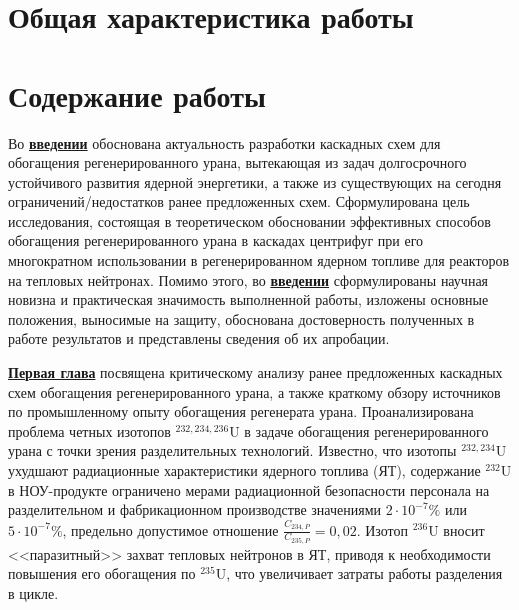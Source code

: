 \section*{Общая характеристика работы}

\newcommand{\actuality}{\underline{\textbf{\actualityTXT}}}
\newcommand{\progress}{\underline{\textbf{\progressTXT}}}
\newcommand{\aim}{\underline{{\textbf\aimTXT}}}
\newcommand{\tasks}{\underline{\textbf{\tasksTXT}}}
\newcommand{\novelty}{\underline{\textbf{\noveltyTXT}}}
\newcommand{\influence}{\underline{\textbf{\influenceTXT}}}
\newcommand{\methods}{\underline{\textbf{\methodsTXT}}}
\newcommand{\defpositions}{\underline{\textbf{\defpositionsTXT}}}
\newcommand{\reliability}{\underline{\textbf{\reliabilityTXT}}}
\newcommand{\probation}{\underline{\textbf{\probationTXT}}}
\newcommand{\contribution}{\underline{\textbf{\contributionTXT}}}
\newcommand{\publications}{\underline{\textbf{\publicationsTXT}}}



\section*{Содержание работы}
Во \underline{\textbf{введении}} обоснована актуальность разработки каскадных схем для обогащения регенерированного урана, вытекающая из задач долгосрочного устойчивого развития ядерной энергетики, а также из существующих на сегодня ограничений/недостатков ранее предложенных схем. Сформулирована цель исследования, состоящая в теоретическом обосновании эффективных способов обогащения регенерированного урана в каскадах центрифуг при его многократном использовании в регенерированном ядерном топливе для реакторов на тепловых нейтронах. Помимо этого, во \underline{\textbf{введении}} сформулированы научная новизна и практическая значимость выполненной работы, изложены основные положения, выносимые на защиту, обоснована достоверность полученных в работе результатов и представлены сведения об их апробации.

\underline{\textbf{Первая глава}} посвящена критическому анализу ранее предложенных каскадных схем обогащения регенерированного урана, а также краткому обзору источников по промышленному опыту обогащения регенерата урана. Проанализирована проблема четных изотопов $^{232,234,236}$U в задаче обогащения регенерированного урана с точки зрения разделительных технологий. Известно, что изотопы $^{232,234}$U ухудшают радиационные характеристики ядерного топлива (ЯТ), содержание $^{232}$U в НОУ-продукте ограничено мерами радиационной безопасности персонала на разделительном и фабрикационном производстве значениями $2\cdot10^{-7} \%$ или $5\cdot10^{-7} \%$, предельно допустимое отношение $\frac{C_{234,{P}}}{C_{235,{P}}} = 0,02$. Изотоп $^{236}$U вносит <<паразитный>> захват тепловых нейтронов в ЯТ, приводя к необходимости повышения его обогащения по $^{235}$U, что увеличивает затраты работы разделения в цикле. 

